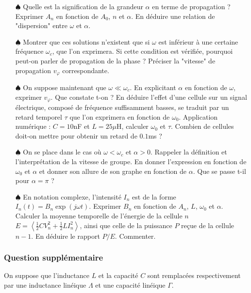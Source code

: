 \documentclass{report}
\begin{document}
\begin{itemize}

	\item[$\spadesuit$] Quelle est la signification de la grandeur $\alpha$ en terme de propagation ? Exprimer $A_n$ en fonction de $A_0$, $n$ et $\alpha$. En déduire une relation de "dispersion" entre $\omega$ et $\alpha$.

	\item[$\spadesuit$] Montrer que ces solutions n'existent que si $\omega$ est inférieur à une certaine fréquence $\omega_c$, que l'on exprimera. Si cette condition est vérifiée, pourquoi peut-on parler de propagation de la phase ? Préciser la "vitesse" de propagation $v_\varphi$ correspondante.
	
	\item[$\spadesuit$] On suppose maintenant que $\omega\ll\omega_c$. En explicitant $\alpha$ en fonction de $\omega$, exprimer $v_\varphi$. Que constate t-on ? En déduire l'effet d'une cellule sur un signal électrique, composé de fréquence suffisamment basses, se traduit par un retard temporel $\tau$ que l'on exprimera en fonction de $\omega_0$. Application numérique : $C=10$nF et $L=25\mu$H, calculer $\omega_0$ et $\tau$. Combien de cellules doit-on mettre pour obtenir un retard de $0.1$ms ?

	\item[$\spadesuit$] On se place dans le cas où $\omega<\omega_c$ et $\alpha>0$. Rappeler la définition et l'interprétation de la vitesse de groupe. En donner l'expression en fonction de $\omega_0$ et $\alpha$ et donner son allure de son graphe en fonction de $\alpha$. Que se passe t-il pour $\alpha=\pi$ ?
	
	\item[$\spadesuit$] En notation complexe, l'intensité $I_n$ est de la forme $I_n(t)=B_n\exp(j\omega t)$. Exprimer $B_n$ en fonction de $A_n$, $L$, $\omega_0$ et $\alpha$. Calculer la moyenne temporelle de l'énergie de la cellule $n$ $E=\left\langle \frac{1}{2}CV_n^2+\frac{1}{2}LI_n^2\right\rangle$, ainsi que celle de la puissance $P$ reçue de la cellule $n-1$. En déduire le rapport $P/E$. Commenter.  	

\end{itemize}

\subsubsection*{Question supplémentaire}

On suppose que l'inductance $L$ et la capacité $C$ sont remplacées respectivement par une inductance linéique $\Lambda$ et une capacité linéique $\Gamma$. 
\end{document}
